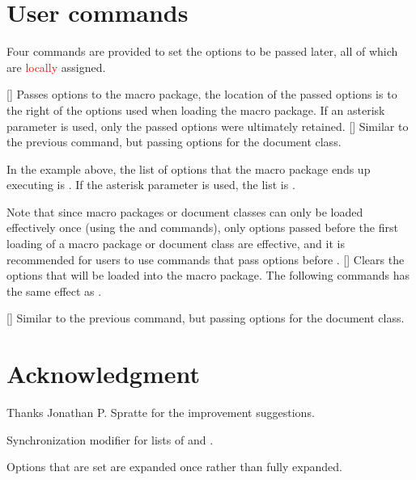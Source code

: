 \documentclass[load-preamble+]{cnltx-doc}
\begin{document}
\section{User commands}
Four commands are provided to set the options to be passed later, all of which are \textcolor{red}{locally} assigned.
\begin{commands}
  [\sarg{}]
  Passes options to the macro package, the location of the passed options is to the right of the options used when loading the macro package. If an asterisk parameter is used, only the passed options were ultimately retained.
  [\sarg{}]
  Similar to the previous command, but passing options for the document class.

  In the example above, the list of options that the  macro package ends up executing is . If the asterisk parameter is used, the list is .

  Note that since macro packages or document classes can only be loaded effectively once (using the  and  commands), only options passed before the first loading of a macro package or document class are effective, and it is recommended for users to use commands that pass options before .
  []
  Clears the options that will be loaded into the macro package. The following commands has the same effect as \code{*}.
  \begin{sourcecode}
  \end{sourcecode}
  []
  Similar to the previous command, but passing options for the document class.
\end{commands}

\section{Acknowledgment}
Thanks Jonathan P. Spratte for the improvement suggestions.

\appendix
\begin{changelog}[simple]
  \begin{version}[v = 1.01,date = 2024/07/15]
  \item Synchronization modifier for lists of  and .
  \item Options that are set are expanded once rather than fully expanded.
  \end{version}
\end{changelog}
\nocite{*}
\end{document}
